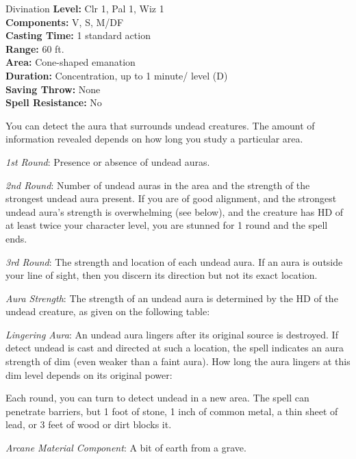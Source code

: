 {Divination}
{
	\textbf{Level:}
	Clr 1, Pal 1, Wiz 1\\
	\textbf{Components:}
	V, S, M/DF\\
	\textbf{Casting Time:}
	1 standard action\\
	\textbf{Range:}
	60 ft.\\
	\textbf{Area:}
	Cone-shaped emanation\\
	\textbf{Duration:}
	Concentration, up to 1 minute/ level (D)\\
	\textbf{Saving Throw:}
	None\\
	\textbf{Spell Resistance:}
	No\\
}
{
	You can detect the aura that surrounds undead creatures. The amount of information revealed depends on how long you study a particular area.

	\textit{1st Round}:
	Presence or absence of undead auras.

	\textit{2nd Round}:
	Number of undead auras in the area and the strength of the strongest undead aura present. If you are of good alignment, and the strongest undead aura's strength is overwhelming (see below), and the creature has HD of at least twice your character level, you are stunned for 1 round and the spell ends.

	\textit{3rd Round}:
	The strength and location of each undead aura. If an aura is outside your line of sight, then you discern its direction but not its exact location.

	\textit{Aura Strength}:
	The strength of an undead aura is determined by the HD of the undead creature, as given on the following table:

	\textit{Lingering Aura}:
	An undead aura lingers after its original source is destroyed. If detect undead is cast and directed at such a location, the spell indicates an aura strength of dim (even weaker than a faint aura). How long the aura lingers at this dim level depends on its original power:

	Each round, you can turn to detect undead in a new area. The spell can penetrate barriers, but 1 foot of stone, 1 inch of common metal, a thin sheet of lead, or 3 feet of wood or dirt blocks it.

	\textit{Arcane Material Component}:
	A bit of earth from a grave.

}
